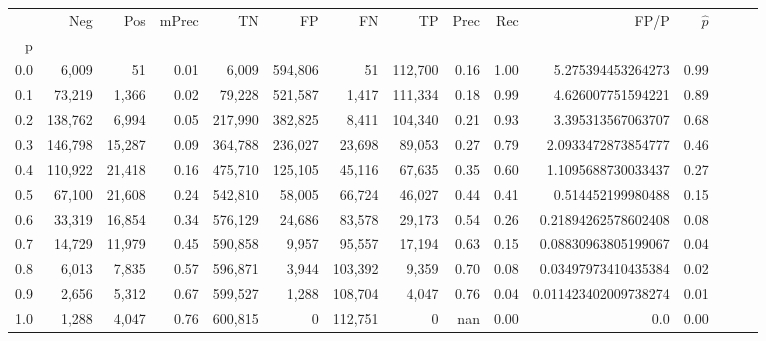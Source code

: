 \begin{tabular}{rrrrrrrrrrrrrrr}
\toprule
{} &      Neg &     Pos & mPrec &       TN &       FP &       FN &       TP &  Prec &   Rec &                  FP/P & $\hat{p}$ \\
p   &          &         &       &          &          &          &          &       &       &                       &           \\
\midrule
0.0 &    6,009 &      51 &  0.01 &    6,009 &  594,806 &       51 &  112,700 &  0.16 &  1.00 &     5.275394453264273 &      0.99 \\
0.1 &   73,219 &   1,366 &  0.02 &   79,228 &  521,587 &    1,417 &  111,334 &  0.18 &  0.99 &     4.626007751594221 &      0.89 \\
0.2 &  138,762 &   6,994 &  0.05 &  217,990 &  382,825 &    8,411 &  104,340 &  0.21 &  0.93 &     3.395313567063707 &      0.68 \\
0.3 &  146,798 &  15,287 &  0.09 &  364,788 &  236,027 &   23,698 &   89,053 &  0.27 &  0.79 &    2.0933472873854777 &      0.46 \\
0.4 &  110,922 &  21,418 &  0.16 &  475,710 &  125,105 &   45,116 &   67,635 &  0.35 &  0.60 &    1.1095688730033437 &      0.27 \\
0.5 &   67,100 &  21,608 &  0.24 &  542,810 &   58,005 &   66,724 &   46,027 &  0.44 &  0.41 &     0.514452199980488 &      0.15 \\
0.6 &   33,319 &  16,854 &  0.34 &  576,129 &   24,686 &   83,578 &   29,173 &  0.54 &  0.26 &   0.21894262578602408 &      0.08 \\
0.7 &   14,729 &  11,979 &  0.45 &  590,858 &    9,957 &   95,557 &   17,194 &  0.63 &  0.15 &   0.08830963805199067 &      0.04 \\
0.8 &    6,013 &   7,835 &  0.57 &  596,871 &    3,944 &  103,392 &    9,359 &  0.70 &  0.08 &   0.03497973410435384 &      0.02 \\
0.9 &    2,656 &   5,312 &  0.67 &  599,527 &    1,288 &  108,704 &    4,047 &  0.76 &  0.04 &  0.011423402009738274 &      0.01 \\
1.0 &    1,288 &   4,047 &  0.76 &  600,815 &        0 &  112,751 &        0 &   nan &  0.00 &                   0.0 &      0.00 \\
\bottomrule
\end{tabular}
